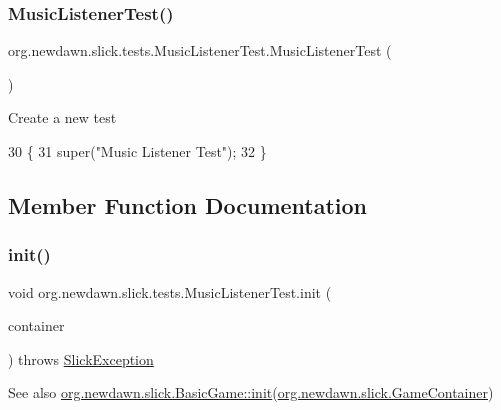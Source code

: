\subsubsection{\texorpdfstring{Music\+Listener\+Test()}{MusicListenerTest()}}
{\footnotesize\ttfamily org.\+newdawn.\+slick.\+tests.\+Music\+Listener\+Test.\+Music\+Listener\+Test (\begin{DoxyParamCaption}{ }\end{DoxyParamCaption})\hspace{0.3cm}{\ttfamily [inline]}}

Create a new test 
\begin{DoxyCode}
30                                \{
31         super(\textcolor{stringliteral}{"Music Listener Test"});
32     \}
\end{DoxyCode}


\subsection{Member Function Documentation}
\mbox{\label{classorg_1_1newdawn_1_1slick_1_1tests_1_1_music_listener_test_a66a6f7c9fed4bf8491ca9a6f1016254b}} 
\subsubsection{\texorpdfstring{init()}{init()}}
{\footnotesize\ttfamily void org.\+newdawn.\+slick.\+tests.\+Music\+Listener\+Test.\+init (\begin{DoxyParamCaption}\item[{\mbox{\hyperlink{classorg_1_1newdawn_1_1slick_1_1_game_container}{Game\+Container}}}]{container }\end{DoxyParamCaption}) throws \mbox{\hyperlink{classorg_1_1newdawn_1_1slick_1_1_slick_exception}{Slick\+Exception}}\hspace{0.3cm}{\ttfamily [inline]}}

\begin{DoxySeeAlso}{See also}
\mbox{\hyperlink{classorg_1_1newdawn_1_1slick_1_1_basic_game_a8af0900217e4d389249f71367b22d114}{org.\+newdawn.\+slick.\+Basic\+Game\+::init}}(\mbox{\hyperlink{classorg_1_1newdawn_1_1slick_1_1_game_container}{org.\+newdawn.\+slick.\+Game\+Container}}) 
\end{DoxySeeAlso}


